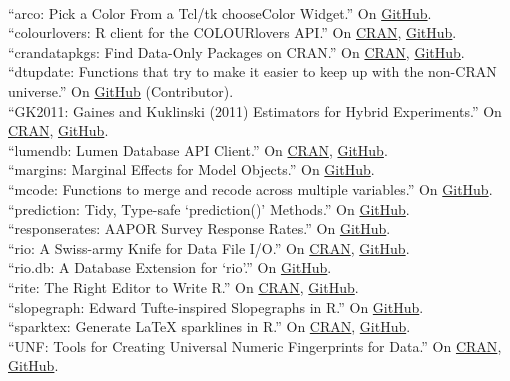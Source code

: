 \documentclass[12pt]{article}
\renewcommand{\section}[1]{\pagebreak[3]%
    \llap{\scshape\smash{\parbox[t]{\marginparwidth}{\raggedright {\color{lg}#1}}}}%
    \vspace{-\baselineskip}\par}
\newcommand{\topic}[1]{\pagebreak[3]\indent {\color{lg}{\footnotesize #1 }}\\}
\newcommand{\entry}[1]{\indent {\color{lg}\guillemotright}\hspace{2pt}#1\vspace{.25em}\\}
\begin{document}
\section{Software}
\topic{R Packages}
	\entry{``arco: Pick a Color From a Tcl/tk chooseColor Widget.'' On \href{https://github.com/leeper/arco}{GitHub}.}
	\entry{``colourlovers: R client for the COLOURlovers API.'' On \href{https://cran.r-project.org/package=colourlovers}{CRAN}, \href{https://github.com/leeper/colourlovers}{GitHub}.}
	\entry{``crandatapkgs: Find Data-Only Packages on CRAN.'' On \href{https://cran.r-project.org/package=crandatapkgs}{CRAN}, \href{https://github.com/leeper/crandatapkgs}{GitHub}.}
	\entry{``dtupdate: Functions that try to make it easier to keep up with the non-CRAN universe.'' On \href{https://github.com/hrbrmstr/dtupdate}{GitHub} (Contributor).}
	\entry{``GK2011: Gaines and Kuklinski (2011) Estimators for Hybrid Experiments.'' On \href{https://cran.r-project.org/package=GK2011}{CRAN}, \href{https://github.com/leeper/GK2011}{GitHub}.}
	\entry{``lumendb: Lumen Database API Client.'' On \href{https://cran.r-project.org/package=lumendb}{CRAN}, \href{https://github.com/leeper/lumendb}{GitHub}.}
	\entry{``margins: Marginal Effects for Model Objects.'' On \href{https://github.com/leeper/margins}{GitHub}.}
	\entry{``mcode: Functions to merge and recode across multiple variables.'' On \href{https://github.com/leeper/mcode}{GitHub}.}
	\entry{``prediction: Tidy, Type-safe `prediction()' Methods.'' On \href{https://github.com/leeper/prediction}{GitHub}.}
	\entry{``responserates: AAPOR Survey Response Rates.'' On \href{https://github.com/leeper/responserates}{GitHub}.}
	\entry{``rio: A Swiss-army Knife for Data File I/O.'' On \href{https://cran.r-project.org/package=rio}{CRAN}, \href{https://github.com/leeper/rio}{GitHub}.}
	\entry{``rio.db: A Database Extension for `rio'.'' On \href{https://github.com/leeper/rio.db}{GitHub}.}
	\entry{``rite: The Right Editor to Write R.'' On \href{https://cran.r-project.org/package=rite}{CRAN}, \href{https://github.com/leeper/rio}{GitHub}.}
	\entry{``slopegraph: Edward Tufte-inspired Slopegraphs in R.'' On \href{https://github.com/leeper/slopegraph}{GitHub}.}
	\entry{``sparktex: Generate LaTeX sparklines in R.'' On \href{https://cran.r-project.org/package=sparktex}{CRAN}, \href{https://github.com/leeper/sparktex}{GitHub}.}
	\entry{``UNF: Tools for Creating Universal Numeric Fingerprints for Data.'' On \href{https://cran.r-project.org/package=UNF}{CRAN}, \href{https://github.com/leeper/UNF}{GitHub}.}
\end{document}
